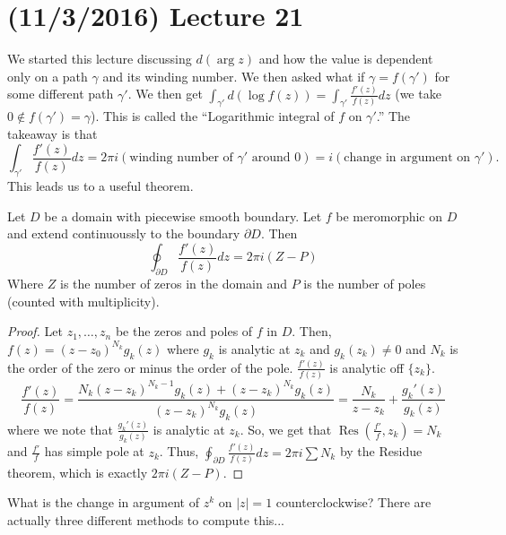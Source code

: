 \documentclass[11pt,leqno,oneside]{amsart}
\newcommand{\Res}{\operatorname{Res}}
\begin{document}
  \section{(11/3/2016) Lecture 21}
  We started this lecture discussing $d(\arg z)$ and how the value is
  dependent only on a path $\gamma$ and its winding number. We then
  asked what if $\gamma = f(\gamma')$ for some different path
  $\gamma' $. We then get $\int_{\gamma'} d(\log f(z)) =
  \int_{\gamma'} \frac{f'(z)}{f(z)}dz$ (we take $0 \not\in f(\gamma')
  = \gamma$). This is called the ``Logarithmic integral of $f$ on
  $\gamma'$.'' The takeaway is that \[
    \int_{\gamma'} \frac{f'(z)}{f(z)} dz = 2 \pi i (\text{winding
      number of }\gamma'\text{ around }0) = i(\text{change in argument
    on }\gamma').
  \]
  This leads us to a useful theorem.
  \begin{thm}
    Let $D$ be a domain with piecewise smooth boundary. Let $f$ be
    meromorphic on $D$ and extend continuoussly to the boundary
    $\partial D$. Then \[
      \oint_{\partial D} \frac{f'(z)}{f(z)} dz = 2\pi i (Z - P)
  \]
  Where $Z$ is the number of zeros in the domain and $P$ is the number
  of poles (counted with multiplicity). 
  \end{thm}
  \begin{proof}
    Let $z_1, \ldots, z_n$ be the zeros and poles of $f$ in $D$. Then,
    $f(z) = (z-z_0)^{N_k}g_k(z)$ where $g_k$ is analytic at $z_k$ and
    $g_k(z_k) \neq 0$ and $N_k$ is the order of the zero or minus the
    order of the pole. $\frac{f'(z)}{f(z)}$ is analytic off
    $\{z_k\}$. \[
      \frac{f'(z)}{f(z)} = \frac{N_k(z-z_k)^{N_k-1}g_k(z) +
        (z-z_k)^{N_k}g_k(z)}{(z-z_k)^{N_k}g_k(z)} = \frac{N_k}{z-z_k}
      + \frac{g_k'(z)}{g_k(z)}
    \]
    where we note that $\frac{g_k'(z)}{g_k(z)}$ is analytic at
    $z_k$. So, we get that $\Res(\frac{f'}{f},z_k) = N_k$ and
    $\frac{f'}{f}$ has simple pole at $z_k$. Thus, $\oint_{\partial D}
    \frac{f'(z)}{f(z)}dz = 2 \pi i \sum N_k$ by the Residue theorem,
    which is exactly $2 \pi i (Z-P)$. 
  \end{proof}
  \begin{example}
    What is the change in argument of $z^k$ on $|z|=1$
    counterclockwise? There are actually three different methods to
    compute this...
  \end{example}
\end{document}
